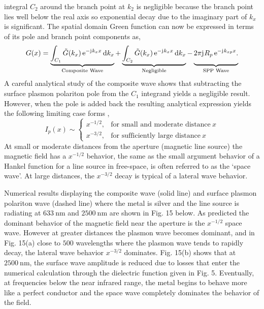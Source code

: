 \documentclass[11pt]{article}
\begin{document}
integral $C_2$ around the branch point at $k_2$ is negligible because the branch point lies well below the real axis so exponential decay due to the imaginary part of $k_x$ is significant. The spatial domain Green function can now be expressed in terms of its pole and branch point components as,
%
\begin{equation}
  G(x) = \underbrace {\int_{C_1} \ti G(k_x) \, \e^{-\j k_x x}\diff{k_x}}_{\text{Composite Wave}} +
  \underbrace{\vphantom{\int_{C_1} \ti G(k_x) \, \e^{-\j k_x x} \diff{k_x}} { \int_{C_2} \ti G(k_x) \, \e^{ - \j k_x x} \diff{k_x}}}_{\text{Negligible}} -
  \underbrace{
  \vphantom{\int_{C_1} \ti G(k_x) \, \e^{-\j k_x x} \diff{k_x}} {2\pi \j R_p}
  \, \e^{ -\j k_{xp} x}.}_{\text{SPP Wave}}
  \label{eq:GF_breakup}
\end{equation}
%
A careful analytical study of the composite wave shows that subtracting the surface plasmon polariton pole from the $C_1$ integrand yields a negligible result. However, when the pole is added back the resulting analytical expression yields the following limiting case forms \cite{Nevels2014},
%
\begin{equation}
  I_p(x) \sim
  \begin{cases}
    x^{-1/2}, & \text{for small and moderate distance}\ x \\
    x^{-3/2}, & \text{for sufficiently large distance}\ x
  \end{cases}
  \label{eq:spp_range}
\end{equation}
%
At small or moderate distances from the aperture (magnetic line source) the magnetic field has a $x^{-1/2}$ behavior, the same as the small argument behavior of a Hankel function for a line source in free-space, is often referred to as the  `space wave'. At large distances, the $x^{-3/2}$ decay is typical of a lateral wave behavior.

Numerical results displaying the composite wave (solid line) and surface plasmon polariton wave (dashed line) where the metal is silver and the line source is radiating at $633~\text{nm}$ and $2500~\text{nm}$ are shown in Fig. 15 below. As predicted the dominant behavior of the magnetic field near the aperture is the $x^{-1/2}$ space wave. However at greater distances the plasmon wave becomes dominant, and in Fig. 15(a) close to $500$ wavelengths where the plasmon wave tends to rapidly decay, the lateral wave behavior $x^{-3/2}$ dominates. Fig. 15(b) shows that at $2500~\text{nm}$, the surface wave amplitude is reduced due to losses that enter the numerical calculation through the dielectric function given in Fig. 5. Eventually, at frequencies below the near infrared range, the metal begins to behave more like a perfect conductor and the space wave completely dominates the behavior of the field.
\end{document}
